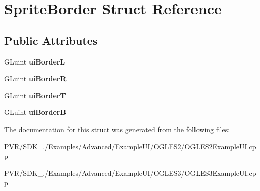 \hypertarget{struct_sprite_border}{\section{Sprite\+Border Struct Reference}
\label{struct_sprite_border}
}
\subsection*{Public Attributes}
\begin{DoxyCompactItemize}
\item 
\hypertarget{struct_sprite_border_a5a32cdf6c0eee12cd82102d8cf6ac594}{G\+Luint {\bfseries ui\+Border\+L}}\label{struct_sprite_border_a5a32cdf6c0eee12cd82102d8cf6ac594}

\item 
\hypertarget{struct_sprite_border_ad8b230f3d664d867a95df1e06998f712}{G\+Luint {\bfseries ui\+Border\+R}}\label{struct_sprite_border_ad8b230f3d664d867a95df1e06998f712}

\item 
\hypertarget{struct_sprite_border_a0511ceb8acffe696c3486590ef690a52}{G\+Luint {\bfseries ui\+Border\+T}}\label{struct_sprite_border_a0511ceb8acffe696c3486590ef690a52}

\item 
\hypertarget{struct_sprite_border_a0a13abc7fc2629d865f2bfa41825a347}{G\+Luint {\bfseries ui\+Border\+B}}\label{struct_sprite_border_a0a13abc7fc2629d865f2bfa41825a347}

\end{DoxyCompactItemize}


The documentation for this struct was generated from the following files\+:\begin{DoxyCompactItemize}
\item 
P\+V\+R/\+S\+D\+K\+\_./\+Examples/\+Advanced/\+Example\+U\+I/\+O\+G\+L\+E\+S2/O\+G\+L\+E\+S2\+Example\+U\+I.\+cpp\item 
P\+V\+R/\+S\+D\+K\+\_./\+Examples/\+Advanced/\+Example\+U\+I/\+O\+G\+L\+E\+S3/O\+G\+L\+E\+S3\+Example\+U\+I.\+cpp\end{DoxyCompactItemize}
